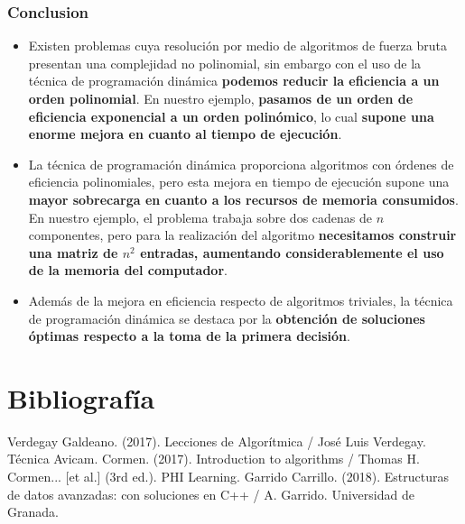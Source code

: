\documentclass[13pt]{beamer}
\begin{document}
    \begin{frame}
		\frametitle{Conclusion}
        \begin{itemize}
            
            \item Existen problemas cuya resolución por medio de algoritmos de fuerza 
            bruta presentan una complejidad no polinomial, sin embargo con el uso de la 
            técnica de programación dinámica \textbf{podemos reducir la eficiencia a un orden 
            polinomial}. En nuestro ejemplo, \textbf{pasamos de un orden de eficiencia exponencial
            a un orden polinómico}, lo cual \textbf{supone una enorme mejora en cuanto al tiempo de 
            ejecución}.
            
            \item La técnica de programación dinámica proporciona algoritmos con órdenes de eficiencia
            polinomiales, pero esta mejora en tiempo de ejecución supone una \textbf{mayor sobrecarga en cuanto 
            a los recursos de memoria consumidos}. En nuestro ejemplo, el problema trabaja sobre dos cadenas de
            $n$ componentes, pero para la realización del algoritmo \textbf{necesitamos construir una matriz de $n^{2}$ 
            entradas, aumentando considerablemente el uso de la memoria del computador}.

            \item Además de la mejora en eficiencia respecto de algoritmos triviales, la técnica de programación
            dinámica se destaca por la \textbf{obtención de soluciones óptimas respecto a la toma de la primera decisión}.
            
            
        \end{itemize}
	\end{frame}


    \section{Bibliografía}

    \begin{frame}
        \begin{thebibliography}{0}
             Verdegay Galdeano. (2017). Lecciones de Algorítmica / José Luis Verdegay. Técnica Avicam.
             Cormen. (2017). Introduction to algorithms / Thomas H. Cormen... [et al.] (3rd ed.). PHI Learning.
             Garrido Carrillo. (2018). Estructuras de datos avanzadas: con soluciones en C++ / A. Garrido. Universidad de Granada.  
        \end{thebibliography}
    \end{frame}
\end{document}

